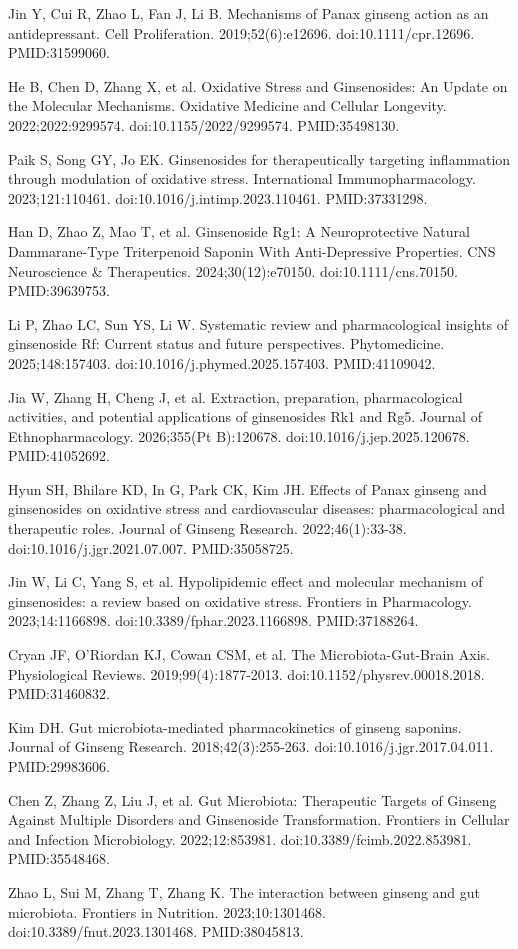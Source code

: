 \documentclass[11pt,oneside]{book}
\newcommand{\reff}[2]{\par\hangindent=7mm\hangafter=1\noindent[#1]\hspace{2mm}#2\par}
\begin{document}
\reff{12}{Jin Y, Cui R, Zhao L, Fan J, Li B. Mechanisms of Panax ginseng action as an antidepressant. Cell Proliferation. 2019;52(6):e12696. doi:10.1111/cpr.12696. PMID:31599060.}
\reff{13}{He B, Chen D, Zhang X, et al. Oxidative Stress and Ginsenosides: An Update on the Molecular Mechanisms. Oxidative Medicine and Cellular Longevity. 2022;2022:9299574. doi:10.1155/2022/9299574. PMID:35498130.}
\reff{14}{Paik S, Song GY, Jo EK. Ginsenosides for therapeutically targeting inflammation through modulation of oxidative stress. International Immunopharmacology. 2023;121:110461. doi:10.1016/j.intimp.2023.110461. PMID:37331298.}
\reff{15}{Han D, Zhao Z, Mao T, et al. Ginsenoside Rg1: A Neuroprotective Natural Dammarane-Type Triterpenoid Saponin With Anti-Depressive Properties. CNS Neuroscience \& Therapeutics. 2024;30(12):e70150. doi:10.1111/cns.70150. PMID:39639753.}
\reff{16}{Li P, Zhao LC, Sun YS, Li W. Systematic review and pharmacological insights of ginsenoside Rf: Current status and future perspectives. Phytomedicine. 2025;148:157403. doi:10.1016/j.phymed.2025.157403. PMID:41109042.}
\reff{17}{Jia W, Zhang H, Cheng J, et al. Extraction, preparation, pharmacological activities, and potential applications of ginsenosides Rk1 and Rg5. Journal of Ethnopharmacology. 2026;355(Pt B):120678. doi:10.1016/j.jep.2025.120678. PMID:41052692.}
\reff{18}{Hyun SH, Bhilare KD, In G, Park CK, Kim JH. Effects of Panax ginseng and ginsenosides on oxidative stress and cardiovascular diseases: pharmacological and therapeutic roles. Journal of Ginseng Research. 2022;46(1):33-38. doi:10.1016/j.jgr.2021.07.007. PMID:35058725.}
\reff{19}{Jin W, Li C, Yang S, et al. Hypolipidemic effect and molecular mechanism of ginsenosides: a review based on oxidative stress. Frontiers in Pharmacology. 2023;14:1166898. doi:10.3389/fphar.2023.1166898. PMID:37188264.}
\reff{20}{Cryan JF, O'Riordan KJ, Cowan CSM, et al. The Microbiota-Gut-Brain Axis. Physiological Reviews. 2019;99(4):1877-2013. doi:10.1152/physrev.00018.2018. PMID:31460832.}
\reff{21}{Kim DH. Gut microbiota-mediated pharmacokinetics of ginseng saponins. Journal of Ginseng Research. 2018;42(3):255-263. doi:10.1016/j.jgr.2017.04.011. PMID:29983606.}
\reff{22}{Chen Z, Zhang Z, Liu J, et al. Gut Microbiota: Therapeutic Targets of Ginseng Against Multiple Disorders and Ginsenoside Transformation. Frontiers in Cellular and Infection Microbiology. 2022;12:853981. doi:10.3389/fcimb.2022.853981. PMID:35548468.}
\reff{23}{Zhao L, Sui M, Zhang T, Zhang K. The interaction between ginseng and gut microbiota. Frontiers in Nutrition. 2023;10:1301468. doi:10.3389/fnut.2023.1301468. PMID:38045813.}
\end{document}
